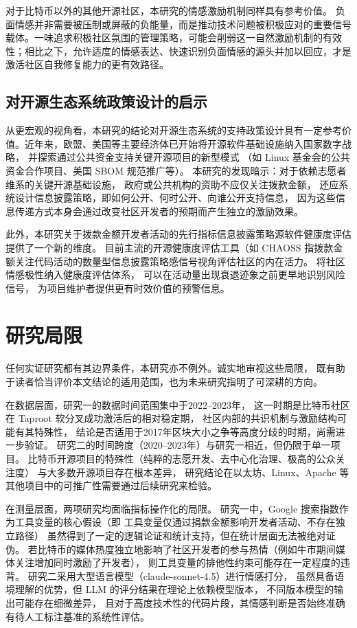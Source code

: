 \documentclass[
    type = master, %
    degree = professional,        %
    decl-page,  %
    twoside,                %
    fontset = fandol %
  ]{njuthesis}
\begin{document}
对于比特币以外的其他开源社区，本研究的情感激励机制同样具有参考价值。
负面情感并非需要被压制或屏蔽的负能量，而是推动技术问题被积极应对的重要信号载体。一味追求积极社区氛围的管理策略，可能会削弱这一自然激励机制的有效性；相比之下，允许适度的情感表达、快速识别负面情感的源头并加以回应，才是激活社区自我修复能力的更有效路径。

\subsection{对开源生态系统政策设计的启示}

从更宏观的视角看，本研究的结论对开源生态系统的支持政策设计具有一定参考价值。近年来，欧盟、美国等主要经济体已开始将开源软件基础设施纳入国家数字战略，
并探索通过公共资金支持关键开源项目的新型模式
（如 Linux 基金会的公共资金合作项目、美国 SBOM 规范推广等）。
本研究的发现暗示：对于依赖志愿者维系的关键开源基础设施，
政府或公共机构的资助不应仅关注拨款金额，
还应系统设计信息披露策略，即如何公开、何时公开、向谁公开支持信息，
因为这些信息传递方式本身会通过改变社区开发者的预期而产生独立的激励效果。

此外，本研究关于拨款金额开发者活动的先行指标信息披露策略源软件健康度评估提供了一个新的维度。
目前主流的开源健康度评估工具（如 CHAOSS 指拨款金额关注代码活动的数量型信息披露策略感信号视角评估社区的内在活力。
将社区情感极性纳入健康度评估体系，
可以在活动量出现衰退迹象之前更早地识别风险信号，
为项目维护者提供更有时效价值的预警信息。


\section{研究局限}

任何实证研究都有其边界条件，本研究亦不例外。诚实地审视这些局限，
既有助于读者恰当评价本文结论的适用范围，也为未来研究指明了可深耕的方向。

在数据层面，研究一的数据时间范围集中于2022--2023年，
这一时期是比特币社区在 Taproot 软分叉成功激活后的相对稳定期，
社区内部的共识机制与激励结构可能有其特殊性，
结论是否适用于2017年区块大小之争等高度分歧的时期，尚需进一步验证。
研究二的时间跨度（2020--2023年）与研究一相近，但仍限于单一项目。
比特币开源项目的特殊性（纯粹的志愿开发、去中心化治理、极高的公众关注度）
与大多数开源项目存在根本差异，
研究结论在以太坊、Linux、Apache 等其他项目中的可推广性需要通过后续研究来检验。

在测量层面，两项研究均面临指标操作化的局限。
研究一中，Google 搜索指数作为工具变量的核心假设（即
工具变量仅通过捐款金额影响开发者活动、不存在独立路径）
虽然得到了一定的逻辑论证和统计支持，但在统计层面无法被绝对证伪。
若比特币的媒体热度独立地影响了社区开发者的参与热情（例如牛市期间媒体关注增加同时激励了开发者），
则工具变量的排他性约束可能存在一定程度的违背。
研究二采用大型语言模型（claude-sonnet-4.5）进行情感打分，
虽然具备语境理解的优势，但 LLM 的评分结果在理论上依赖模型版本，
不同版本模型的输出可能存在细微差异，
且对于高度技术性的代码片段，其情感判断是否始终准确有待人工标注基准的系统性评估。
\end{document}
